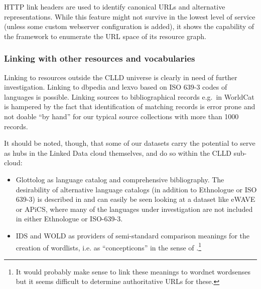 \documentclass[a4paper,10pt]{article}
\begin{document}
HTTP link headers are used to identify canonical URLs and alternative representations. %
%
While this feature might not survive in the lowest level of service (unless some custom
webserver configuration is added), it shows the capability of the framework to enumerate
the URL space of its resource graph.


\subsubsection{Linking with other resources and vocabularies}

Linking to resources outside the CLLD universe is clearly in need of further investigation.
Linking to dbpedia and lexvo based on ISO 639-3 codes of languages is possible.
Linking sources to bibliographical records e.g.~in WorldCat is hampered by the fact that
identification of matching records is error prone and not doable ``by hand'' for our typical
source collections with more than 1000 records.

It should be noted, though, that some of our datasets carry the potential to serve as hubs
in the Linked Data cloud themselves, and do so within the CLLD sub-cloud:
\begin{itemize}
\item Glottolog as language catalog and comprehensive bibliography. The desirability of
alternative language catalogs (in addition to Ethnologue or ISO 639-3) is described in
 and can easily be seen looking at a dataset like eWAVE or APiCS, where
many of the languages under investigation are not included in either Ethnologue or ISO-639-3.
\item IDS and WOLD as providers of semi-standard comparison meanings for the
creation of wordlists, i.e. as ``concepticons'' in the sense of .\footnote{It
would probably make sense to link these meanings to wordnet wordsenses but it seems difficult
to determine authoritative URLs for these.}
\end{itemize}
\end{document}

